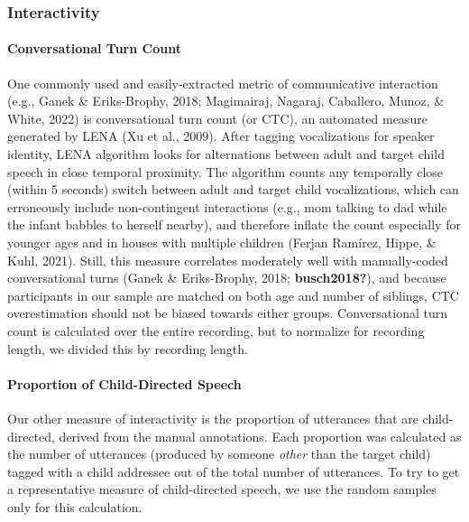 \documentclass[
  man,floatsintext]{apa6}
\let\oldparagraph\paragraph
\renewcommand{\paragraph}[1]{\oldparagraph{#1}\mbox{}}
\begin{document}
\hypertarget{interactivity}{%
\subsubsection{Interactivity}\label{interactivity}}

\hypertarget{conversational-turn-count}{%
\paragraph{Conversational Turn Count}\label{conversational-turn-count}}

One commonly used and easily-extracted metric of communicative interaction (e.g., Ganek \& Eriks-Brophy, 2018; Magimairaj, Nagaraj, Caballero, Munoz, \& White, 2022) is conversational turn count (or CTC), an automated measure generated by LENA (Xu et al., 2009). After tagging vocalizations for speaker identity, LENA algorithm looks for alternations between adult and target child speech in close temporal proximity. The algorithm counts any temporally close (within 5 seconds) switch between adult and target child vocalizations, which can erroneously include non-contingent interactions (e.g., mom talking to dad while the infant babbles to herself nearby), and therefore inflate the count especially for younger ages and in houses with multiple children (Ferjan Ramírez, Hippe, \& Kuhl, 2021). Still, this measure correlates moderately well with manually-coded conversational turns (Ganek \& Eriks-Brophy, 2018; \textbf{busch2018?}), and because participants in our sample are matched on both age and number of siblings, CTC overestimation should not be biased towards either groups. Conversational turn count is calculated over the entire recording, but to normalize for recording length, we divided this by recording length.

\hypertarget{proportion-of-child-directed-speech}{%
\paragraph{Proportion of Child-Directed Speech}\label{proportion-of-child-directed-speech}}

Our other measure of interactivity is the proportion of utterances that are child-directed, derived from the manual annotations. Each proportion was calculated as the number of utterances (produced by someone \emph{other} than the target child) tagged with a child addressee out of the total number of utterances. To try to get a representative measure of child-directed speech, we use the random samples only for this calculation.
\end{document}
